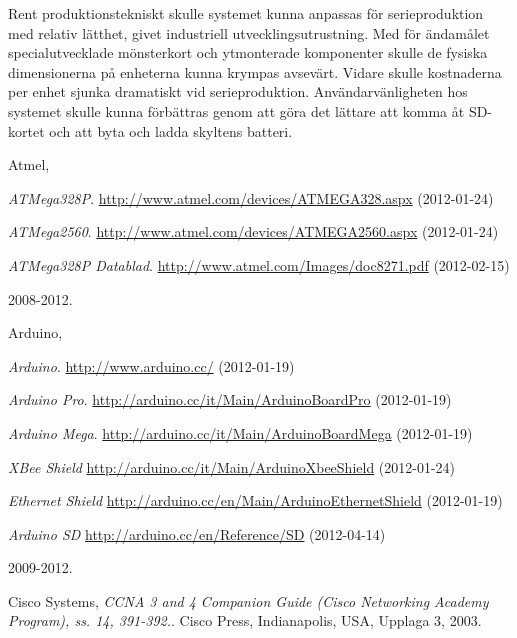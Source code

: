 \documentclass[a4paper,11pt]{article}
\newcounter{qcounter}
\begin{document}
Rent produktionstekniskt skulle systemet kunna anpassas för serieproduktion med relativ lätthet, givet industriell utvecklingsutrustning. Med för ändamålet specialutvecklade mönsterkort och ytmonterade komponenter skulle de fysiska dimensionerna på enheterna kunna krympas avsevärt. Vidare skulle kostnaderna per enhet sjunka dramatiskt vid serieproduktion. Användarvänligheten hos systemet skulle kunna förbättras genom att göra det lättare att komma åt SD-kortet och att byta och ladda skyltens batteri. 

\pagebreak

\clearpage
{}
{}

\begin{thebibliography}{9}

\label{atmel}
   Atmel, \\
   \begin{list}{[]}{}
   \item \emph{ATMega328P}.
   \url{http://www.atmel.com/devices/ATMEGA328.aspx} (2012-01-24)
   \item \emph{ATMega2560}.
   \url{http://www.atmel.com/devices/ATMEGA2560.aspx} (2012-01-24)
   \item \emph{ATMega328P Datablad}.
   \url{http://www.atmel.com/Images/doc8271.pdf} (2012-02-15)
   \end{list}
   2008-2012.

\label{arduino}
   Arduino,\\
   \begin{list}{[]}{}
   \item{\emph{Arduino}. \url{http://www.arduino.cc/} (2012-01-19)}
   \item{\emph{Arduino Pro}. \url{http://arduino.cc/it/Main/ArduinoBoardPro} (2012-01-19)}
   \item{\emph{Arduino Mega}. \url{http://arduino.cc/it/Main/ArduinoBoardMega} (2012-01-19)}
   \item{\emph{XBee Shield} \url{http://arduino.cc/it/Main/ArduinoXbeeShield} (2012-01-24)}
   \item{\emph{Ethernet Shield} \url{http://arduino.cc/en/Main/ArduinoEthernetShield} (2012-01-19)}
   \item{\emph{Arduino SD} \url{http://arduino.cc/en/Reference/SD} (2012-04-14)}
   \end{list}
   2009-2012.

\label{cisco}
    Cisco Systems,
    \emph{CCNA 3 and 4 Companion Guide (Cisco Networking Academy Program), ss. 14, 391-392.}.
    Cisco Press, Indianapolis, USA,
    Upplaga 3,
    2003.


\end{thebibliography}
\end{document}
